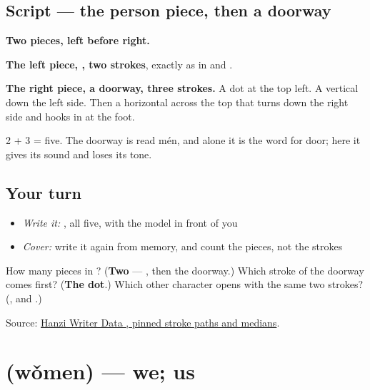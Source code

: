 \subsection*{Script — the person piece, then a doorway}

\begin{quote}
\end{quote}

\textbf{Two pieces, left before right.}

\textbf{The left piece, , two strokes}, exactly as in  and .

\textbf{The right piece, a doorway, three strokes.} A dot at the top left. A vertical down the left side. Then a horizontal across the top that turns down the right side and hooks in at the foot.

2 + 3 = five. The doorway is read mén, and alone it is the word for door; here it gives  its sound and loses its tone.

\subsection*{Your turn}
\begin{itemize}
\raggedright
  \item \emph{Write it:} , all five, with the model in front of you
  \item \emph{Cover:} write it again from memory, and count the pieces, not the strokes
\end{itemize}

\begin{tcolorbox}[breakable,colback=teal!4,colframe=teal!35!black,title={Before you move on}]
How many pieces in ? (\textbf{Two} — , then the doorway.) Which stroke of the doorway comes first? (\textbf{The dot}.) Which other character opens with the same two strokes? (\textbf{}, and .)

Source: \href{https://raw.githubusercontent.com/chanind/hanzi-writer-data/68d10a4b21150cae5e1ebbd223eed289cf32d90c/data/\%E4\%BB\%AC.json}{Hanzi Writer Data , pinned stroke paths and medians}.
\end{tcolorbox}
\section[\texorpdfstring{\zh{我们} (wǒmen)}{我们 (wǒmen)}]{ (wǒmen) — we; us}

